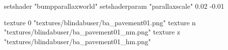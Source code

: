 	setshader "bumpparallaxworld"
	setshaderparam "parallaxscale" 0.02 -0.01

		texture 0 "textures/blindabuser/ba_pavement01.png"
		texture n "textures/blindabuser/ba_pavement01_nm.png"
		texture z "textures/blindabuser/ba_pavement01_hm.png"
